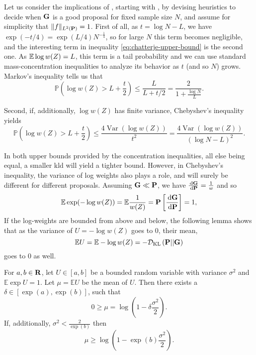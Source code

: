 Let us consider the implications of , starting with , by devising heuristics to decide when $\G$ is a good proposal for fixed sample size $N$, and assume for simplicity that $ \lVert f \rVert_{L^{2}(\P)} = 1 $.
First of all, as $t = \log N - L$, we have $\exp(- t / 4) =  \exp (L / 4)N^{-\tfrac{1}{4}}$, so for large $N$ this term becomes negligible, and the interesting term in inequality \eqref{eq:chatterje-upper-bound} is the second one. As $\E \log w(Z) = L$, this term is a tail probability and we can use standard mass-concentration inequalities to analyze its behavior as $t$ (and so $N$) grows. Markov's inequality tells us that 
$$
\mathbb P \left( \log w(Z) > L + \frac{t}{2} \right) \leq \frac{L}{L + t / 2} = \frac{2}{1 + \frac{\log N}{L}}.
$$

Second, if, additionally, $\log w(Z)$ has finite variance, Chebyshev's inequality yields 
$$
\mathbb P \left( \log w (Z) > L + \frac{t}{2} \right) \leq \frac{4\operatorname{Var} (\log w(Z))}{t^{2}} = \frac{4\operatorname{Var} (\log w(Z))}{\left( \log N - L \right)^2}.
$$

In both upper bounds provided by the concentration inequalities, all else being equal, a smaller \acrshort{kld} will yield a tighter bound. However, in Chebyshev's inequality, the variance of log weights also plays a role, and will surely be different for different proposals.
Assuming $\G \ll \P$, we have $ \frac{\d \G}{\d\P} = \frac{1}{w}$ and so 
$$\mathbb E \exp (- \log w(Z) ) = \mathbb E \frac{1}{w(Z)} = \P \left[\frac{\d \G}{\d\P}\right] = 1,$$
If the log-weights are bounded from above and below, the following lemma shows that as the variance of $U = -\log w(Z)$ goes to $0$, their mean,
$$
\mathbb E U = \mathbb E - \log w(Z) = -\Dkl{\P}{\G}
$$
goes to $0$ as well.
\begin{lemma}
    \label{lem:bounded-log-variance}
    For $a,b \in \R$, let $U \in [a,b]$ be a bounded random variable with variance $\sigma^{2}$ and $\mathbb E \exp U = 1$. Let $\mu = \mathbb E U$ be the mean of $U$. Then there exists a $\delta \in [\exp(a),\exp(b)]$, such that 
    $$
    0 \geq \mu = \log \left( 1 - \delta \frac{\sigma^{2}}{2} \right).
    $$
    If, additionally, $\sigma^{2} < \frac{2}{\exp(b)}$ then 
    $$
    \mu \geq \log \left( 1 - \exp(b) \frac{\sigma^{2}}{2} \right).
    $$
\end{lemma}

